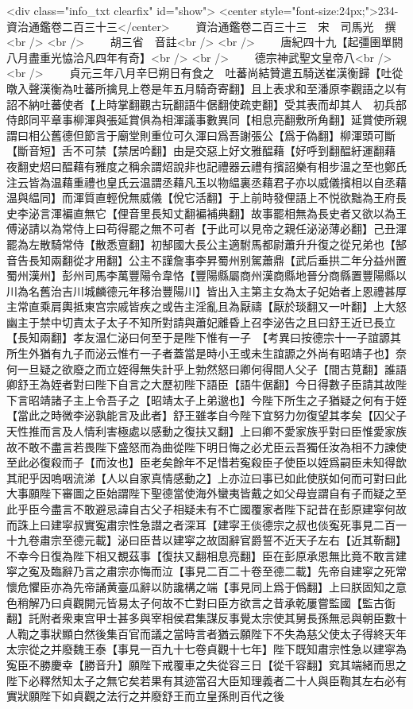 <div class="info_txt clearfix" id="show">
<center style="font-size:24px;">234-資治通鑑卷二百三十三</center>
  　　資治通鑑卷二百三十三　宋　司馬光　撰<br />
<br />
　　胡三省　音註<br />
<br />
　　唐紀四十九【起彊圉單閼八月盡重光恊洽凡四年有奇】<br />
<br />
　　德宗神武聖文皇帝八<br />
<br />
　　貞元三年八月辛巳朔日有食之　吐蕃尚結贊遣五騎送崔漢衡歸【吐從暾入聲漢衡為吐蕃所擒見上卷是年五月騎奇寄翻】且上表求和至潘原李觀語之以有詔不納吐蕃使者【上時掌翻觀古玩翻語牛倨翻使疏吏翻】受其表而却其人　初兵部侍郎同平章事柳渾與張延賞俱為相渾議事數異同【相息亮翻敷所角翻】延賞使所親謂曰相公舊德但節言于廟堂則重位可久渾曰爲吾謝張公【爲于偽翻】柳渾頭可斷【斷音短】舌不可禁【禁居吟翻】由是交惡上好文雅醖藉【好呼到翻醖紆運翻藉夜翻史炤曰醖藉有雅度之稱余謂炤說非也記禮器云禮有擯詔樂有相步温之至也鄭氏注云皆為温藉重禮也皇氏云温謂丞藉凡玉以物緼裏丞藉君子亦以威儀擯相以自丞藉温與緼同】而渾質直輕侻無威儀【侻它活翻】于上前時發俚語上不悦欲黜為王府長史李泌言渾褊直無它【俚音里長知丈翻褊補典翻】故事罷相無為長史者又欲以為王傅泌請以為常侍上曰苟得罷之無不可者【于此可以見帝之親任泌泌薄必翻】己丑渾罷為左散騎常侍【散悉亶翻】初郜國大長公主適駙馬都尉蕭升升復之從兄弟也【郜音告長知兩翻從才用翻】公主不謹詹事李昇蜀州别駕蕭鼎【武后垂拱二年分益州置蜀州漢州】彭州司馬李萬豐陽令韋恪【豐陽縣屬商州漢商縣地晉分商縣置豐陽縣以川為名舊治吉川城麟德元年移治豐陽川】皆出入主第主女為太子妃始者上恩禮甚厚主常直乘肩輿抵東宫宗戚皆疾之或告主淫亂且為厭禱【厭於琰翻又一叶翻】上大怒幽主于禁中切責太子太子不知所對請與蕭妃離昏上召李泌告之且曰舒王近已長立【長知兩翻】孝友温仁泌曰何至于是陛下惟有一子　【考異曰按德宗十一子誼謜其所生外猶有九子而泌云惟冇一子者蓋當是時小王或未生誼謜之外尚有昭靖子也】奈何一旦疑之欲廢之而立姪得無失計乎上勃然怒曰卿何得間人父子【間古莧翻】誰語卿舒王為姪者對曰陛下自言之大歷初陛下語臣【語牛倨翻】今日得數子臣請其故陛下言昭靖諸子主上令吾子之【昭靖太子上弟邈也】今陛下所生之子猶疑之何有于姪【當此之時微李泌孰能言及此者】舒王雖孝自今陛下宜努力勿復望其孝矣【囚父子天性推而言及人情利害極處以感動之復扶又翻】上曰卿不愛家族乎對曰臣惟愛家族故不敢不盡言若畏陛下盛怒而為曲從陛下明日悔之必尤臣云吾獨任汝為相不力諫使至此必復殺而子【而汝也】臣老矣餘年不足惜若寃殺臣子使臣以姪爲嗣臣未知得歆其祀乎因嗚咽流涕【人以自家真情感動之】上亦泣曰事已如此使朕如何而可對曰此大事願陛下審圖之臣始謂陛下聖德當使海外蠻夷皆戴之如父母豈謂自有子而疑之至此乎臣今盡言不敢避忌諱自古父子相疑未有不亡國覆家者陛下記昔在彭原建寜何故而誅上曰建寜叔實寃肅宗性急譛之者深耳【建寜王倓德宗之叔也倓寃死事見二百一十九卷肅宗至德元載】泌曰臣昔以建寜之故固辭官爵誓不近天子左右【近其靳翻】不幸今日復為陛下相又覩茲事【復扶又翻相息亮翻】臣在彭原承恩無比竟不敢言建寜之寃及臨辭乃言之肅宗亦悔而泣【事見二百二十卷至德二載】先帝自建寜之死常懷危懼臣亦為先帝誦黄臺瓜辭以防讒構之端【事見同上爲于僞翻】上曰朕固知之意色稍解乃曰貞觀開元皆易太子何故不亡對曰臣方欲言之昔承乾屢嘗監國【監古衘翻】託附者衆東宫甲士甚多與宰相侯君集謀反事覺太宗使其舅長孫無忌與朝臣數十人鞫之事狀顯白然後集百官而議之當時言者猶云願陛下不失為慈父使太子得終天年太宗從之并廢魏王泰【事見一百九十七卷貞觀十七年】陛下既知肅宗性急以建寜為寃臣不勝慶幸【勝音升】願陛下戒覆車之失從容三日【從千容翻】䆒其端緒而思之陛下必釋然知太子之無它矣若果有其迹當召大臣知理義者二十人與臣鞫其左右必有實狀願陛下如貞觀之法行之并廢舒王而立皇孫則百代之後